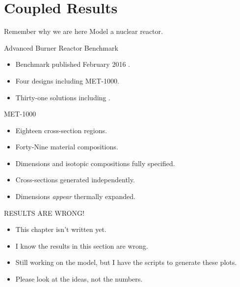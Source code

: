 \section{Coupled Results}
\label{sec:coupledResults}

\begin{frame}{Remember why we are here}
  \pause
  \huge Model a nuclear reactor.
\end{frame}

\begin{frame}{Advanced Burner Reactor Benchmark}
  \begin{itemize}
    \item Benchmark published February 2016 \cite{abr}.
    \item Four designs including MET-1000.
    \item Thirty-one solutions including \dif.
  \end{itemize}
\end{frame}

\begin{frame}{MET-1000}
  \begin{itemize}
    \item Eighteen cross-section regions.
    \item Forty-Nine material compositions.
    \item Dimensions and isotopic compositions fully specified.
  \end{itemize}
  \vspace{0.2in}
  \begin{itemize}
    \item Cross-sections generated independently.
    \item Dimensions \textit{appear} thermally expanded.
  \end{itemize}
\end{frame}

\begin{frame}{RESULTS ARE WRONG!}
  \begin{itemize}
    \item This chapter isn't written yet.
    \item I know the results in this section are wrong.
    \item Still working on the model, but I have the scripts to generate these
      plots.
    \item Please look at the ideas, not the numbers.
  \end{itemize}
\end{frame}

